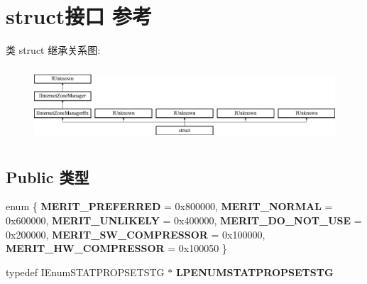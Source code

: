 \hypertarget{interfacestruct}{}\section{struct接口 参考}
\label{interfacestruct}
类 struct 继承关系图\+:\begin{figure}[H]
\begin{center}
\leavevmode
\includegraphics[height=2.800000cm]{interfacestruct}
\end{center}
\end{figure}
\subsection*{Public 类型}
\begin{DoxyCompactItemize}
\item 
\mbox{\label{interfacestruct_acfe10488d43964cb63bc2997a2e464b4}} 
enum \{ \newline
{\bfseries M\+E\+R\+I\+T\+\_\+\+P\+R\+E\+F\+E\+R\+R\+ED} = 0x800000, 
{\bfseries M\+E\+R\+I\+T\+\_\+\+N\+O\+R\+M\+AL} = 0x600000, 
{\bfseries M\+E\+R\+I\+T\+\_\+\+U\+N\+L\+I\+K\+E\+LY} = 0x400000, 
{\bfseries M\+E\+R\+I\+T\+\_\+\+D\+O\+\_\+\+N\+O\+T\+\_\+\+U\+SE} = 0x200000, 
\newline
{\bfseries M\+E\+R\+I\+T\+\_\+\+S\+W\+\_\+\+C\+O\+M\+P\+R\+E\+S\+S\+OR} = 0x100000, 
{\bfseries M\+E\+R\+I\+T\+\_\+\+H\+W\+\_\+\+C\+O\+M\+P\+R\+E\+S\+S\+OR} = 0x100050
 \}
\item 
\mbox{\label{interfacestruct_a83f37c689f4aa79975b7b92fa4dc7199}} 
typedef I\+Enum\+S\+T\+A\+T\+P\+R\+O\+P\+S\+E\+T\+S\+TG $\ast$ {\bfseries L\+P\+E\+N\+U\+M\+S\+T\+A\+T\+P\+R\+O\+P\+S\+E\+T\+S\+TG}
\end{DoxyCompactItemize}
